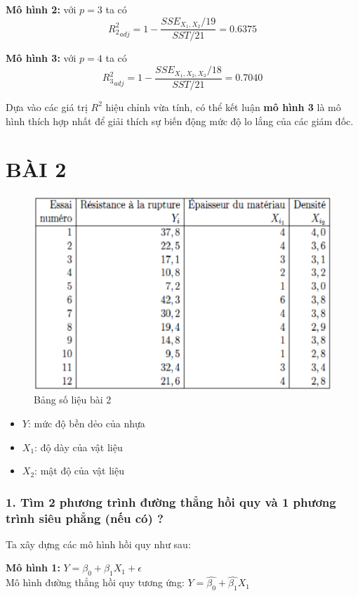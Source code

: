 \documentclass[a4paper]{article}
\theoremstyle{nonumberplain}
\begin{document}
\textbf{Mô hình 2:} với $p=3$ ta có $${R^2_2}_{adj} = 1 - \displaystyle \frac{SSE_{X_1,X_2}/19}{SST/21} = 0.6375$$

\textbf{Mô hình 3:} với $p=4$ ta có $${R^2_3}_{adj} = 1 - \displaystyle \frac{SSE_{X_1,X_2,X_3}/18}{SST/21} = 0.7040$$

Dựa vào các giá trị $R^2$ hiệu chỉnh vừa tính, có thể kết luận \textbf{mô hình 3} là mô hình thích hợp nhất để giải thích sự biến động mức độ lo lắng của các giám đốc.
\newpage
\section*{BÀI 2}

\begin{figure}[h!]
	\centering
	\includegraphics[width=0.6\linewidth]{bai-2-data}
	\caption{Bảng số liệu bài 2}
	\label{fig:bai-2-data}
\end{figure}

\begin{itemize}
	\renewcommand\labelitemi{--}
	\item $Y$: mức độ bền dẻo của nhựa
	\item $X_1$: độ dày của vật liệu
	\item $X_2$: mật độ của vật liệu
\end{itemize}

\subsubsection*{1. Tìm 2 phương trình đường thẳng hồi quy và 1 phương trình siêu phẳng (nếu có) ?}

Ta xây dựng các mô hình hồi quy như sau:

\textbf{Mô hình 1:} $Y= \beta_0 + \beta_1 X_1 + \epsilon$\\
Mô hình đường thẳng hồi quy tương ứng: $Y= \hat{\beta_0} + \hat{\beta_1} X_1$
\end{document}

